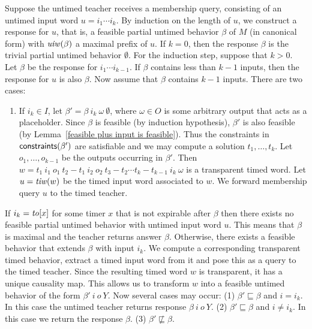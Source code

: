 Suppose the untimed teacher receives a membership query, consisting of an untimed input word
$u = i_1 \cdots i_k$.
By induction on the length of $u$, 
we construct a response for $u$, that is, a feasible partial untimed behavior $\beta$ of $M$ (in canonical form)
with $\mathit{uiw}(\beta)$ a maximal prefix of $u$.
If $k=0$, then the response $\beta$ is the trivial partial untimed behavior $\emptyset$.
For the induction step, suppose that $k>0$.
Let $\beta$ be the response for $i_1 \cdots i_{k-1}$.
If $\beta$ contains less than $k-1$ inputs, then the response for $u$ is also $\beta$.
Now assume that $\beta$ contains $k-1$ inputs. There are two cases:
\begin{enumerate}
\item
If $i_k \in I$, let $\beta' = \beta ~ i_k ~ \omega ~ \emptyset$, where $\omega \in O$ is some arbitrary output that acts as a placeholder.
Since $\beta$ is feasible (by induction hypothesis), $\beta'$ is also feasible 
(by Lemma~\ref{feasible plus input is feasible}).
Thus the constraints in $\mathsf{constraints}({\beta'})$ are satisfiable and we may compute a solution $t_1 ,\ldots, t_k$.
Let $o_1 ,\ldots, o_{k-1}$ be the outputs occurring in $\beta'$. Then
$w = t_1 ~ i_1 ~ o_1 ~ t_2 - t_1 ~ i_2 ~ o_2 ~ t_3- t_2 \cdots t_k - t_{k-1} ~ i_k ~ \omega$ is a transparent timed word.
Let $u = \mathit{tiw}(w)$ be the timed input word associated to $w$.
We forward membership query $u$ to the timed teacher.
\end{enumerate}
If $i_k = \mathit{to}[x]$ for some timer $x$ that is not expirable after $\beta$ then there exists no feasible partial untimed behavior
with untimed input word $u$. This means that $\beta$ is maximal and the teacher returns answer $\beta$.
Otherwise, there exists a feasible behavior that extends $\beta$ with input $i_k$. 
We compute
a corresponding transparent timed behavior, extract a timed input word from it and pose this as a query to the timed teacher.
Since the resulting timed word $w$ is transparent, it has a unique causality map.
This allows us to transform $w$ into a feasible untimed behavior of the form $\beta' ~ i ~ o ~ Y$.
Now several cases may occur:
(1) $\beta' \sqsubseteq \beta$ and $i = i_k$. In this case the untimed teacher returns response $\beta ~ i ~ o ~ Y$.
(2) $\beta' \sqsubseteq \beta$ and $i \neq i_k$. In this case we return the response $\beta$.
(3) $\beta' \not\sqsubseteq \beta$.


